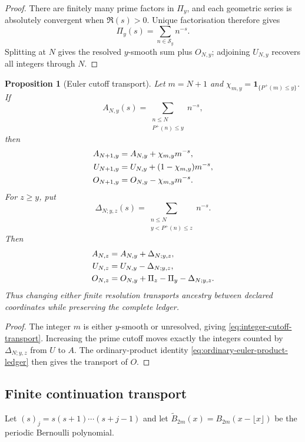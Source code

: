 \documentclass[11pt,a4paper]{article}
\newtheorem{proposition}[theorem]{Proposition}
\theoremstyle{definition}
\begin{document}
\begin{proof}
There are finitely many prime factors in $\Pi_y$, and each geometric series is
absolutely convergent when $\Re(s)>0$. Unique factorisation therefore gives
\[
  \Pi_y(s)=\sum_{n\in\mathcal S_y}n^{-s}.
\]
Splitting at $N$ gives the resolved $y$-smooth sum plus $O_{N,y}$; adjoining
$U_{N,y}$ recovers all integers through $N$.
\end{proof}

\begin{proposition}[Euler cutoff transport]
\label{prop:euler-cutoff-transport}
Let $m=N+1$ and
$\chi_{m,y}=\mathbf1_{\{P^+(m)\leq y\}}$. If
\[
  A_{N,y}(s)=\sum_{\substack{n\leq N\\P^+(n)\leq y}}n^{-s},
\]
then
\begin{align}
  A_{N+1,y}&=A_{N,y}+\chi_{m,y}m^{-s},\notag\\
  U_{N+1,y}&=U_{N,y}+(1-\chi_{m,y})m^{-s},\notag\\
  O_{N+1,y}&=O_{N,y}-\chi_{m,y}m^{-s}.
\label{eq:integer-cutoff-transport}
\end{align}
For $z\geq y$, put
\[
  \Delta_{N;y,z}(s)
  =\sum_{\substack{n\leq N\\y<P^+(n)\leq z}}n^{-s}.
\]
Then
\begin{align}
  A_{N,z}&=A_{N,y}+\Delta_{N;y,z},\notag\\
  U_{N,z}&=U_{N,y}-\Delta_{N;y,z},\notag\\
  O_{N,z}&=O_{N,y}+\Pi_z-\Pi_y-\Delta_{N;y,z}.
\label{eq:prime-cutoff-transport}
\end{align}
Thus changing either finite resolution transports ancestry between declared
coordinates while preserving the complete ledger.
\end{proposition}

\begin{proof}
The integer $m$ is either $y$-smooth or unresolved, giving
\cref{eq:integer-cutoff-transport}. Increasing the prime cutoff moves exactly
the integers counted by $\Delta_{N;y,z}$ from $U$ to $A$. The ordinary-product
identity \cref{eq:ordinary-euler-product-ledger} then gives the transport of
$O$.
\end{proof}

\subsection{Finite continuation transport}

Let $(s)_j=s(s+1)\cdots(s+j-1)$ and let
\(\widetilde B_{2m}(x)=B_{2m}(x-\lfloor x\rfloor)\) be the periodic Bernoulli
polynomial.
\end{document}

